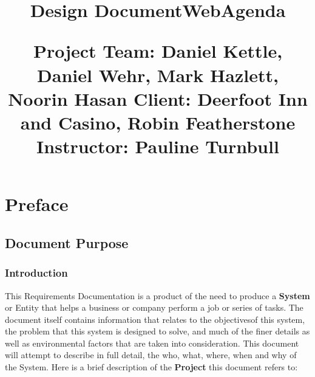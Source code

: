 \documentclass[letterpaper,12pt]{report}
\begin{document}
\title{Design Document\linebreak WebAgenda\linebreak \linebreak 
	\begin{small}\textbf{Project Team:} Daniel Kettle, Daniel Wehr, Mark Hazlett, Noorin Hasan\linebreak
	\textbf{Client:} Deerfoot Inn and Casino, Robin Featherstone\linebreak
	\textbf{Instructor:} Pauline Turnbull\end{small}}

\author{}
\maketitle
\tableofcontents
\listoffigures

\part{Preface}
\chapter{Document Purpose}
\section{Introduction}
\hspace{1cm}This Requirements Documentation is a product of the need to produce a \textbf{System} or Entity that helps a business or company perform a job or series of tasks. The document itself contains information that relates to the objectives\space of this system, the problem that this system is designed to solve, and much of the finer details as well as environmental factors that are taken into consideration. This document will attempt to describe in full detail, the who, what, where, when and why of the System.
Here is a brief description of the \textbf{Project} this document refers to:
\end{document}
